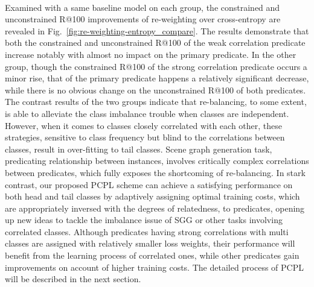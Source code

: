 \documentclass[sigconf]{acmart}
\begin{document}
\\\indent Examined with a same baseline model on each group, the constrained and unconstrained R@100 improvements of re-weighting over cross-entropy are revealed in Fig.~\ref{fig:re-weighting-entropy_compare}. The results demonstrate that both the constrained and unconstrained R@100 of the weak correlation predicate increase notably with almost no impact on the primary predicate. In the other group, though the constrained R@100 of the strong correlation predicate occurs a minor rise, that of the primary predicate happens a relatively significant decrease, while there is no obvious change on the unconstrained R@100 of both predicates. The contrast results of the two groups indicate that re-balancing, to some extent, is able to alleviate the class imbalance trouble when classes are independent. However, when it comes to classes closely correlated with each other, these strategies, sensitive to class frequency but blind to the correlations between classes, result in over-fitting to tail classes. Scene graph generation task, predicating relationship between instances, involves critically complex correlations between predicates, which fully exposes the shortcoming of re-balancing. In stark contrast, our proposed PCPL scheme can achieve a satisfying performance on both head and tail classes by adaptively assigning optimal training costs, which are appropriately inversed with the degrees of relatedness, to predicates, opening up new ideas to tackle the imbalance issue of SGG or other tasks involving correlated classes. Although predicates having strong correlations with multi classes are assigned with relatively smaller loss weights, their performance will benefit from the learning process of correlated ones, while other predicates gain improvements on account of higher training costs. The detailed process of PCPL will be described in the next section. 
\end{document}
